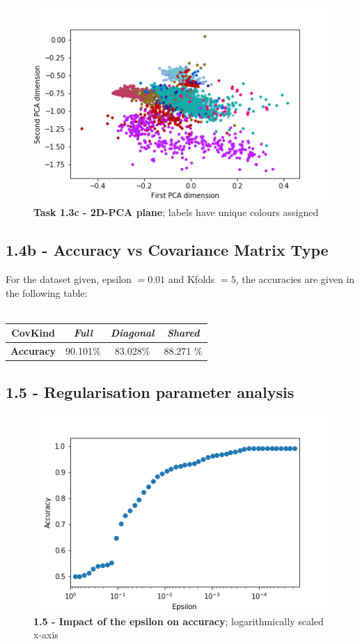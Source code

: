 \documentclass[12pt]{article}
\begin{document}
\begin{figure}[!htb]
\centering
\includegraphics[scale=0.8]{task1_3c_scatter_classes.png}
\caption{\textbf{Task 1.3c - 2D-PCA plane}; labels have unique colours assigned}
\end{figure}

\newpage

\subsection*{1.4b - Accuracy vs Covariance Matrix Type}

For the dataset given, epsilon $ = 0.01$ and Kfolds $ = 5$, the accuracies are given in the following table:\\\\
\begin{tabular}{|c|c|c|c|}
\hline 
\textbf{CovKind} & \emph{Full} & \emph{Diagonal} & \emph{Shared} \\ 
\hline 
\textbf{Accuracy} & 90.101\% & 83.028\% & 88.271 \% \\ 
\hline 
\end{tabular} 

\subsection*{1.5 - Regularisation parameter analysis}

\begin{figure}
\centering
\includegraphics[scale=1]{task1_4c_epsilons_accuracy.png}
\caption{\textbf{1.5 - Impact of the epsilon on accuracy}; logarithmically scaled x-axis}
\label{epsilon_analysis}
\end{figure}
\end{document}
